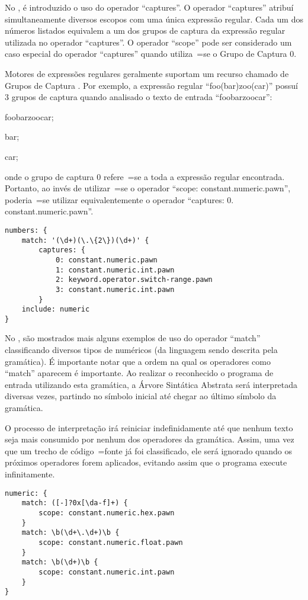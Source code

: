 No ,
é introduzido o uso do operador ``captures''.
O operador ``captures'' atribuí simultaneamente diversos escopos com uma única expressão regular.
Cada um dos números listados equivalem a um dos grupos de captura da expressão regular utilizada no operador ``captures''.
O operador ``scope'' pode ser considerado um caso especial do operador ``captures'' quando utiliza~=se o Grupo de Captura 0.

Motores de expressões regulares geralmente suportam um recurso chamado de Grupos de Captura \cite{expressionGrammarsWithRegexLikeCaptures}.
Por exemplo,
a expressão regular ``foo(bar)zoo(car)'' possuí 3 grupos de captura quando analisado o texto de entrada ``foobarzoocar'':
\begin{inparaenum}[1)]\setcounter{enumi}{-1}
\item foobarzoocar;
\item bar;
\item car;
\end{inparaenum}%
onde o grupo de captura 0 refere~=se a toda a expressão regular encontrada.
Portanto,
ao invés de utilizar~=se o operador ``scope:
constant.numeric.pawn'',
poderia~=se utilizar equivalentemente o operador ``captures:
0.
constant.numeric.pawn''.
\begin{lstlisting}[caption={Exemplo de Gramática, Grupos de Captura},label={exemploDeGramaticaPawn3},style=yaml_style]
numbers: {
    match: '(\d+)(\.\{2\})(\d+)' {
        captures: {
            0: constant.numeric.pawn
            1: constant.numeric.int.pawn
            2: keyword.operator.switch-range.pawn
            3: constant.numeric.int.pawn
        }
    include: numeric
}
\end{lstlisting}

No ,
são mostrados mais alguns exemplos de uso do operador ``match'' classificando diversos tipos de numéricos (da linguagem sendo descrita pela gramática).
É importante notar que a ordem na qual os operadores como ``match'' aparecem é importante.
Ao realizar o reconhecido o programa de entrada utilizando esta gramática,
a Árvore Sintática Abstrata \cite{ahoCompilerDragonBook} será interpretada diversas vezes,
partindo no símbolo inicial até chegar ao último símbolo da gramática.

O processo de interpretação irá reiniciar indefinidamente até que nenhum texto seja mais consumido por nenhum dos operadores da gramática.
Assim,
uma vez que um trecho de código~=fonte já foi classificado,
ele será ignorado quando os próximos operadores forem aplicados,
evitando assim que o programa execute infinitamente.
\begin{lstlisting}[caption={Exemplo de Gramática, Tipos numéricos},label={exemploDeGramaticaPawn4},style=yaml_style]
numeric: {
    match: ([-]?0x[\da-f]+) {
        scope: constant.numeric.hex.pawn
    }
    match: \b(\d+\.\d+)\b {
        scope: constant.numeric.float.pawn
    }
    match: \b(\d+)\b {
        scope: constant.numeric.int.pawn
    }
}
\end{lstlisting}

